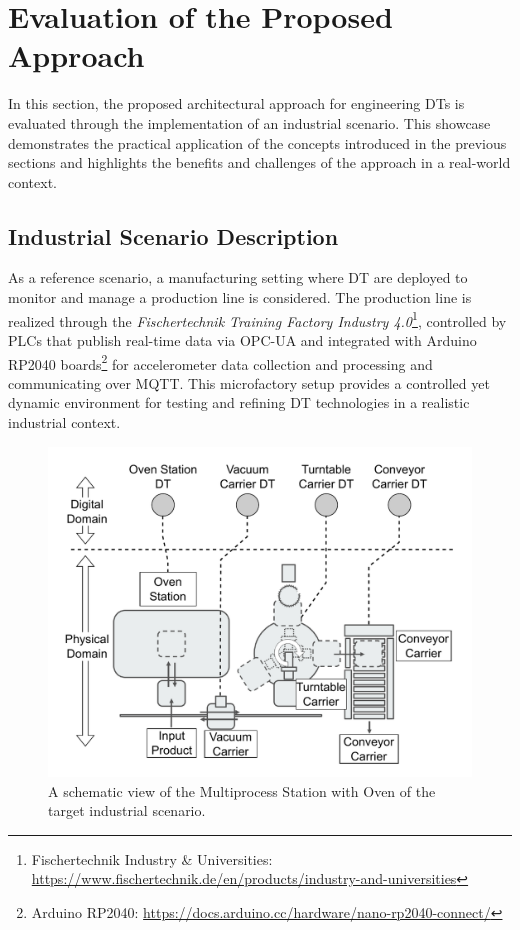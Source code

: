 \section{Evaluation of the Proposed Approach}

In this section, the proposed architectural approach for engineering \acp{DT} is evaluated through the implementation of an industrial scenario.
%
This showcase demonstrates the practical application of the concepts introduced in the previous sections and highlights the benefits and challenges of the approach in a real-world context.

\subsection{Industrial Scenario Description}

As a reference scenario, a manufacturing setting where \ac{DT} are deployed to monitor and manage a production line is considered. 
%
The production line is realized through the \emph{Fischertechnik Training Factory Industry 4.0}\footnote{Fischertechnik Industry \& Universities: \url{https://www.fischertechnik.de/en/products/industry-and-universities}}, controlled by PLCs that publish real-time data via OPC-UA and integrated with Arduino RP2040 boards\footnote{Arduino RP2040: \url{https://docs.arduino.cc/hardware/nano-rp2040-connect/}} for accelerometer data collection and processing and communicating over MQTT.
This microfactory setup provides a controlled yet dynamic environment for testing and refining DT technologies in a realistic industrial context.

\begin{figure}[t]
    \centering
    \includegraphics[width=0.75\columnwidth]{figures/engineering-wldt/fischer-layout-first-level-dt.pdf}
    \caption{A schematic view of the Multiprocess Station with Oven of the target industrial scenario.}
    \label{fig:fischer-dt-first-level}
\end{figure}

